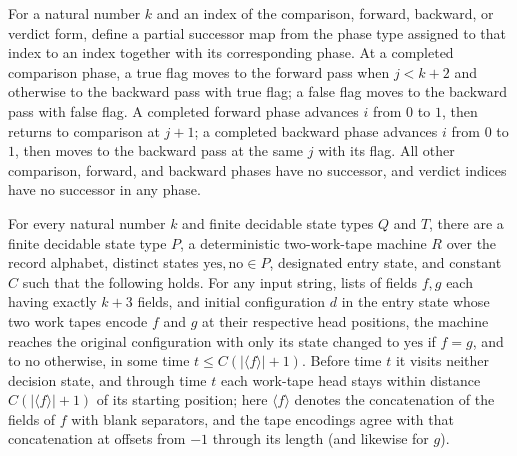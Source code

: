 \begin{definition}
\label{Turing.recordEqNext}
\leanok
{}
For a natural number $k$ and an index of the comparison, forward, backward, or verdict
form, define a partial successor map from the phase type assigned to that index to an
index together with its corresponding phase. At a completed comparison phase, a true
flag moves to the forward pass when $j<k+2$ and otherwise to the backward pass with true
flag; a false flag moves to the backward pass with false flag. A completed forward phase
advances $i$ from $0$ to $1$, then returns to comparison at $j+1$; a completed backward
phase advances $i$ from $0$ to $1$, then moves to the backward pass at the same $j$ with
its flag. All other comparison, forward, and backward phases have no successor, and
verdict indices have no successor in any phase.
\end{definition}

\begin{theorem}
\label{Turing.exists_recordEqTM}
\leanok
{}
For every natural number $k$ and finite decidable state types $Q$ and $T$, there are a
finite decidable state type $P$, a deterministic two-work-tape machine $R$ over the
record alphabet, distinct states $\mathrm{yes},\mathrm{no}\in P$, designated entry
state, and constant $C$ such that the following holds. For any input string, lists of
fields $f,g$ each having exactly $k+3$ fields, and initial configuration $d$ in the
entry state whose two work tapes encode $f$ and $g$ at their respective head positions,
the machine reaches the original configuration with only its state changed to
$\mathrm{yes}$ if $f=g$, and to $\mathrm{no}$ otherwise, in some time $t\le C(|\langle
f\rangle|+1)$. Before time $t$ it visits neither decision state, and through time $t$
each work-tape head stays within distance $C(|\langle f\rangle|+1)$ of its starting
position; here $\langle f\rangle$ denotes the concatenation of the fields of $f$ with
blank separators, and the tape encodings agree with that concatenation at offsets from
$-1$ through its length (and likewise for $g$).
\end{theorem}

